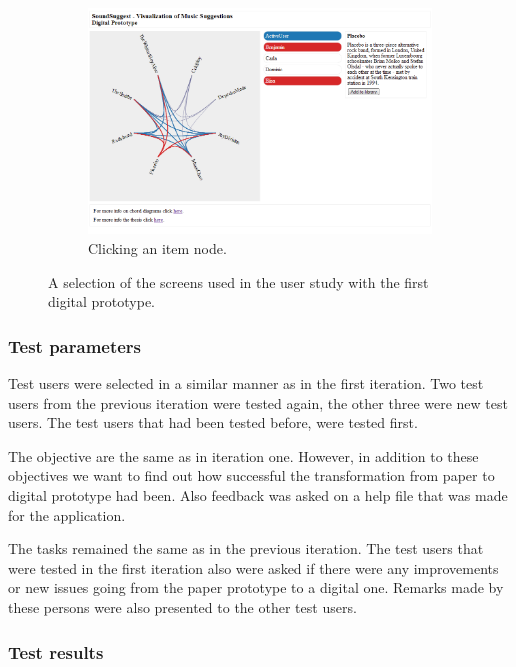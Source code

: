 \begin{figure}
\begin{subfigure}[b]{0.3\textwidth}
					\includegraphics[width=\textwidth]{img/prototype_soundsuggest1_item_click}
					\caption{Clicking an item node.}
					\label{figure:prototype_soundsuggest1_item_click}
	\end{subfigure}
	\caption{A selection of the screens used in the user study with the first digital prototype.}%
	\label{figure:prototype_soundsuggest1}%
\end{figure}



\subsubsection{Test parameters}\label{chapter:prototype:section:soundsuggest1:setup}

Test users were selected in a similar manner as in the first iteration. Two test users from the previous iteration were tested again, the other three were new test users. The test users that had been tested before, were tested first.

The objective are the same as in iteration one. However, in addition to these objectives we want to find out how successful the transformation from paper to digital prototype had been. Also feedback was asked on a help file that was made for the application.

The tasks remained the same as in the previous iteration. The test users that were tested in the first iteration also were asked if there were any improvements or new issues going from the paper prototype to a digital one. Remarks made by these persons were also presented to the other test users.


\subsubsection{Test results}\label{chapter:prototype:section:soundsuggest1:results}

